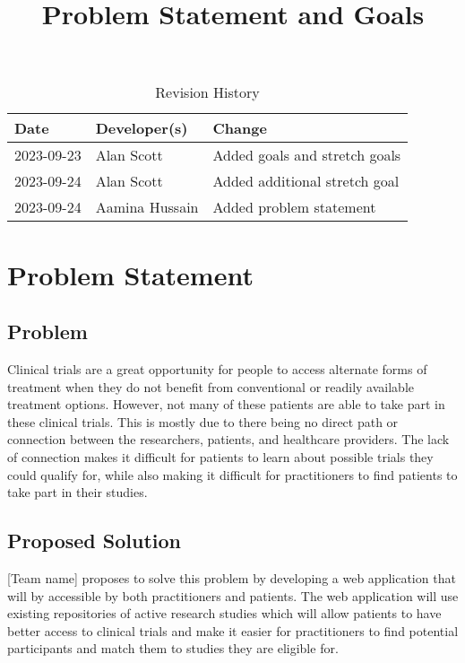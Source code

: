 \documentclass{article}
\title{Problem Statement and Goals\\\progname}
\author{\authname}
\date{}
\begin{document}
\maketitle

\begin{table}[hp]
\caption{Revision History} \label{TblRevisionHistory}
\begin{tabularx}{\textwidth}{llX}
\toprule
\textbf{Date} & \textbf{Developer(s)} & \textbf{Change}\\
\midrule
2023-09-23 & Alan Scott & Added goals and stretch goals\\
2023-09-24 & Alan Scott & Added additional stretch goal \\
2023-09-24 & Aamina Hussain & Added problem statement \\
\bottomrule
\end{tabularx}
\end{table}

\section{Problem Statement}


\subsection{Problem}
Clinical trials are a great opportunity for people to access alternate forms of treatment when they do not benefit 
from conventional or readily available treatment options. However, not many of these patients are able to take part 
in these clinical trials. This is mostly due to there being no direct path or connection between the researchers, patients, 
and healthcare providers. The lack of connection makes it difficult for patients to learn about possible trials they could 
qualify for, while also making it difficult for practitioners to find patients to take part in their studies.

\subsection{Proposed Solution}
[Team name] proposes to solve this problem by developing a web application that will by accessible by both practitioners 
and patients. The web application will use existing repositories of active research studies which will allow patients to 
have better access to clinical trials and make it easier for practitioners to find potential participants and match them to 
studies they are eligible for.
\end{document}
